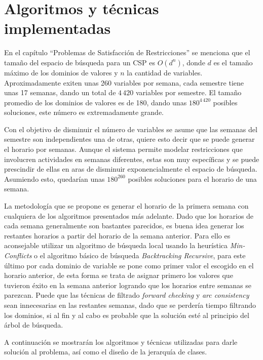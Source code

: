 \section{Algoritmos y t\'ecnicas implementadas}

En el cap\'itulo ``Problemas de Satisfacci\'on de Restricciones'' se menciona que el tamaño del espacio de b\'usqueda para un CSP es $O(d^{n})$, donde $d$ es el tamaño m\'aximo de los dominios de valores y $n$ la cantidad de variables. Aproximadamente exiten unas 260 variables por semana, cada semestre tiene unas 17 semanas, dando un total de $4\,420$ variables por semestre. El tamaño promedio de los dominios de valores es de 180, dando unas $180^{4\,420}$ posibles soluciones, este n\'umero es extremadamente grande.

Con el objetivo de disminuir el n\'umero de variables se asume que las semanas del semestre son independientes una de otras, quiere esto decir que se puede generar el horario por semanas. Aunque el sistema permite modelar restricciones que involucren actividades en semanas diferentes, estas son muy espec\'ificas y se puede prescindir de ellas en aras de disminuir exponencialmente el espacio de b\'usqueda. Asumiendo esto, quedar\'ian unas $180^{260}$ posibles soluciones para el horario de una semana.

La metodolog\'ia que se propone es generar el horario de la primera semana con cualquiera de los algoritmos presentados m\'as adelante. Dado que los horarios de cada semana generalmente son bastantes parecidos, es buena idea generar los restantes horarios a partir del horario de la semana anterior. Para ello es aconsejable utilizar un algoritmo de b\'usqueda local usando la heur\'istica \emph{Min-Conflicts} o el algoritmo b\'asico de b\'usqueda \emph{Backtracking Recursive}, para este \'ultimo por cada dominio de variable se pone como primer valor el escogido en el horario anterior, de esta forma se trata de asignar primero los valores que tuvieron \'exito en la semana anterior logrando que los horarios entre semanas se parezcan. Puede que las t\'ecnicas de filtrado \emph{forward checking} y \emph{arc consistency} sean innecesarias en las restantes semanas, dado que se perder\'ia tiempo filtrando los dominios, si al fin y al cabo es probable que la soluci\'on est\'e al principio del \'arbol de b\'usqueda.

A continuaci\'on se mostrar\'an los algoritmos y t\'ecnicas utilizadas para darle soluci\'on al problema, as\'i como el diseño de la jerarqu\'ia de clases.

